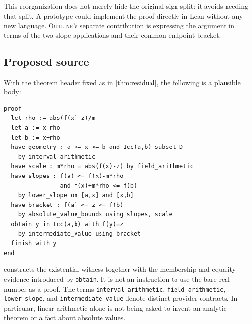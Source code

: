 \documentclass[11pt,a4paper]{article}
\newcommand{\code}[1]{\nolinkurl{#1}}
\newcommand{\Outline}{\textsc{Outline}}
\theoremstyle{definition}
\theoremstyle{remark}
\numberwithin{equation}{section}
\begin{document}
This reorganization does not merely hide the original sign split: it avoids needing that split. A prototype could implement the proof directly in Lean without any new language. \Outline's separate contribution is expressing the argument in terms of the two slope applications and their common endpoint bracket.

\subsection{Proposed source}
With the theorem header fixed as in \cref{thm:residual}, the following is a plausible body:
\begin{lstlisting}[caption={Proposed \Outline\ syntax for the endpoint proof.}]
proof
  let rho := abs(f(x)-z)/m
  let a := x-rho
  let b := x+rho
  have geometry : a <= x <= b and Icc(a,b) subset D
    by interval_arithmetic
  have scale : m*rho = abs(f(x)-z) by field_arithmetic
  have slopes : f(a) <= f(x)-m*rho
                and f(x)+m*rho <= f(b)
    by lower_slope on [a,x] and [x,b]
  have bracket : f(a) <= z <= f(b)
    by absolute_value_bounds using slopes, scale
  obtain y in Icc(a,b) with f(y)=z
    by intermediate_value using bracket
  finish with y
end
\end{lstlisting}
\texttt{} constructs the existential witness together with the membership and equality evidence introduced by \code{obtain}. It is not an instruction to use the bare real number as a proof. The terms \code{interval_arithmetic}, \code{field_arithmetic}, \code{lower_slope}, and \code{intermediate_value} denote distinct provider contracts. In particular, linear arithmetic alone is not being asked to invent an analytic theorem or a fact about absolute values.
\end{document}
